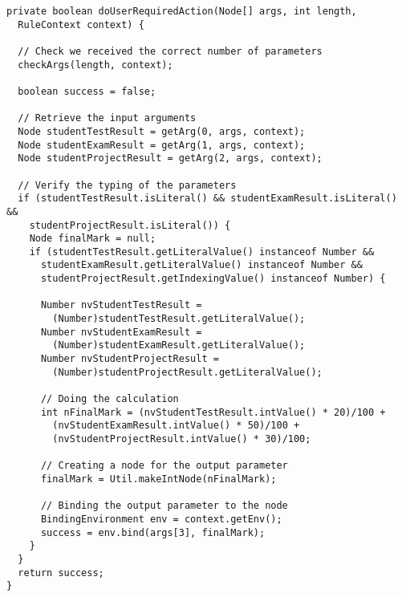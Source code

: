 \documentclass{amsart}
\begin{document}
\begin{small}
\begin{verbatim} 
private boolean doUserRequiredAction(Node[] args, int length, 
  RuleContext context) {
  
  // Check we received the correct number of parameters
  checkArgs(length, context);

  boolean success = false;
  
  // Retrieve the input arguments
  Node studentTestResult = getArg(0, args, context);
  Node studentExamResult = getArg(1, args, context);
  Node studentProjectResult = getArg(2, args, context);

  // Verify the typing of the parameters
  if (studentTestResult.isLiteral() && studentExamResult.isLiteral() && 
    studentProjectResult.isLiteral()) {
    Node finalMark = null;
    if (studentTestResult.getLiteralValue() instanceof Number && 
      studentExamResult.getLiteralValue() instanceof Number &&
      studentProjectResult.getIndexingValue() instanceof Number) {
    
      Number nvStudentTestResult = 
        (Number)studentTestResult.getLiteralValue();
      Number nvStudentExamResult = 
        (Number)studentExamResult.getLiteralValue();
      Number nvStudentProjectResult = 
        (Number)studentProjectResult.getLiteralValue();
    
      // Doing the calculation
      int nFinalMark = (nvStudentTestResult.intValue() * 20)/100 + 
        (nvStudentExamResult.intValue() * 50)/100 +
        (nvStudentProjectResult.intValue() * 30)/100;
      
      // Creating a node for the output parameter
      finalMark = Util.makeIntNode(nFinalMark);  
      
      // Binding the output parameter to the node
      BindingEnvironment env = context.getEnv();    
      success = env.bind(args[3], finalMark);
    } 
  }   
  return success;
}
\end{verbatim}
\end{small}
\end{document}

